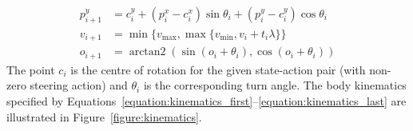 \documentclass[10pt]{article}
\theoremstyle{plain}
\DeclareMathOperator*{\arctantwo}{arctan2}
\begin{document}
\begin{align}
    p_{i+1}^{y} & = c_{i}^{y} + (p_{i}^{x} - c_{i}^{x}) \sin{\theta_{i}} + (p_{i}^{y} - c_{i}^{y}) \cos{\theta_{i}} \\
    v_{i+1} & = \min\{ v_{\max}, \max\{ v_{\min}, v_{i} + t_{i} \lambda \} \} \\
    o_{i+1} & = \arctantwo{(\sin{(o_{i} + \theta_{i})}, \cos{(o_{i} + \theta_{i})})} \label{equation:kinematics_last}
\end{align}
The point $c_{i}$ is the centre of rotation for the given state-action pair (with non-zero steering action) and $\theta_{i}$ is the corresponding turn angle.
The body kinematics specified by Equations~\ref{equation:kinematics_first}--\ref{equation:kinematics_last} are illustrated in Figure~\ref{figure:kinematics}.
\end{document}
